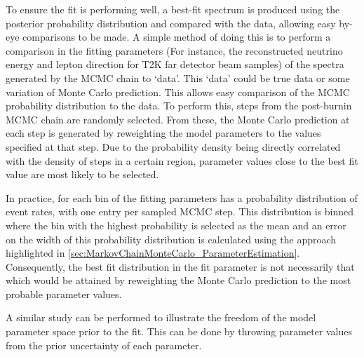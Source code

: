 To ensure the fit is performing well, a best-fit spectrum is produced using the posterior probability distribution and compared with the data, allowing easy by-eye comparisons to be made. A simple method of doing this is to perform a comparison in the fitting parameters (For instance, the reconstructed neutrino energy and lepton direction for T2K far detector beam samples) of the spectra generated by the MCMC chain to `data'. This `data' could be true data or some variation of Monte Carlo prediction. This allows easy comparison of the MCMC probability distribution to the data. To perform this,  steps from the post-burnin MCMC chain are randomly selected. From these, the Monte Carlo prediction at each step is generated by reweighting the model parameters to the values specified at that step. Due to the probability density being directly correlated with the density of steps in a certain region, parameter values close to the best fit value are most likely to be selected.

In practice, for each bin of the fitting parameters has a probability distribution of event rates, with one entry per sampled MCMC step. This distribution is binned where the bin with the highest probability is selected as the mean and an error on the width of this probability distribution is calculated using the approach highlighted in \autoref{sec:MarkovChainMonteCarlo_ParameterEstimation}. Consequently, the best fit distribution in the fit parameter is not necessarily that which would be attained by reweighting the Monte Carlo prediction to the most probable parameter values.

A similar study can be performed to illustrate the freedom of the model parameter space prior to the fit. This can be done by throwing parameter values from the prior uncertainty of each parameter.
